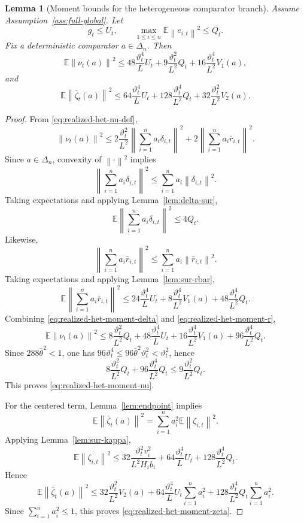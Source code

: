 \documentclass{article}
\newtheorem{lemma}[theorem]{Lemma}
\theoremstyle{definition}
\newcommand{\EE}{\mathbb E}
\newcommand{\norm}[1]{\left\lVert #1\right\rVert}
\begin{document}
\begin{lemma}[Moment bounds for the heterogeneous comparator branch]
\label{lem:realized-het-moments}
Assume Assumption~\ref{ass:full-global}. Let
\[
g_t\le U_t,
\qquad
\max_{1\le i\le n}\EE\norm{e_{i,t}}^2\le Q_t.
\]
Fix a deterministic comparator $a\in\Delta_n$. Then
\begin{equation}
\EE\norm{\nu_t(a)}^2
\le
48\frac{\vartheta_t^4}{L}U_t
+
9\frac{\vartheta_t^2}{L^2}Q_t
+
16\frac{\vartheta_t^4}{L^2}V_1(a),
\label{eq:realized-het-moment-nu}\end{equation}
and
\begin{equation}
\EE\norm{\bar\zeta_t(a)}^2
\le
64\frac{\vartheta_t^4}{L}U_t
+
128\frac{\vartheta_t^4}{L^2}Q_t
+
32\frac{\vartheta_t^2}{L^2}V_2(a).
\label{eq:realized-het-moment-zeta}\end{equation}
\end{lemma}

\begin{proof}
From \eqref{eq:realized-het-nu-def},
\[
\norm{\nu_t(a)}^2
\le
2\frac{\vartheta_t^2}{L^2}
\left\|
\sum_{i=1}^n a_i\delta_{i,t}
\right\|^2
+
2
\left\|
\sum_{i=1}^n a_i \bar r_{i,t}
\right\|^2.
\]
Since $a\in\Delta_n$, convexity of $\norm{\cdot}^2$ implies
\[
\left\|
\sum_{i=1}^n a_i\delta_{i,t}
\right\|^2
\le
\sum_{i=1}^n a_i \norm{\delta_{i,t}}^2.
\]
Taking expectations and applying Lemma~\ref{lem:delta-sur},
\begin{equation}
\EE
\left\|
\sum_{i=1}^n a_i\delta_{i,t}
\right\|^2
\le 4Q_t.
\label{eq:realized-het-moment-delta}\end{equation}
Likewise,
\[
\left\|
\sum_{i=1}^n a_i\bar r_{i,t}
\right\|^2
\le
\sum_{i=1}^n a_i \norm{\bar r_{i,t}}^2.
\]
Taking expectations and applying Lemma~\ref{lem:sur-rbar},
\begin{equation}
\EE
\left\|
\sum_{i=1}^n a_i\bar r_{i,t}
\right\|^2
\le
24\frac{\vartheta_t^4}{L}U_t
+
8\frac{\vartheta_t^4}{L^2}V_1(a)
+
48\frac{\vartheta_t^4}{L^2}Q_t.
\label{eq:realized-het-moment-r}\end{equation}
Combining \eqref{eq:realized-het-moment-delta} and \eqref{eq:realized-het-moment-r},
\[
\EE\norm{\nu_t(a)}^2
\le
8\frac{\vartheta_t^2}{L^2}Q_t
+
48\frac{\vartheta_t^4}{L}U_t
+
16\frac{\vartheta_t^4}{L^2}V_1(a)
+
96\frac{\vartheta_t^4}{L^2}Q_t.
\]
Since $288\bar\theta^2<1$, one has $96\vartheta_t^4\le 96\bar\theta^2\vartheta_t^2<\vartheta_t^2$, hence
\[
8\frac{\vartheta_t^2}{L^2}Q_t
+
96\frac{\vartheta_t^4}{L^2}Q_t
\le
9\frac{\vartheta_t^2}{L^2}Q_t.
\]
This proves \eqref{eq:realized-het-moment-nu}.

For the centered term, Lemma~\ref{lem:endpoint} implies
\[
\EE\norm{\bar\zeta_t(a)}^2
=
\sum_{i=1}^n a_i^2\EE\norm{\zeta_{i,t}}^2.
\]
Applying Lemma~\ref{lem:sur-kappa},
\[
\EE\norm{\zeta_{i,t}}^2
\le
32\frac{\vartheta_t^2v_i^2}{L^2H_i b_i}
+
64\frac{\vartheta_t^4}{L}U_t
+
128\frac{\vartheta_t^4}{L^2}Q_t.
\]
Hence
\[
\EE\norm{\bar\zeta_t(a)}^2
\le
32\frac{\vartheta_t^2}{L^2}V_2(a)
+
64\frac{\vartheta_t^4}{L}U_t\sum_{i=1}^n a_i^2
+
128\frac{\vartheta_t^4}{L^2}Q_t\sum_{i=1}^n a_i^2.
\]
Since $\sum_{i=1}^n a_i^2\le 1$, this proves \eqref{eq:realized-het-moment-zeta}.
\end{proof}
\end{document}
